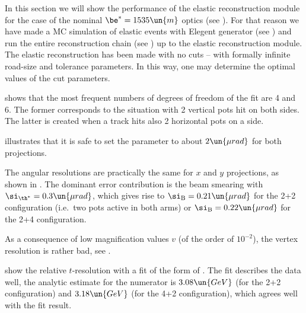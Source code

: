 In this section we will show the performance of the elastic reconstruction module for the case of the nominal $\be^* = 1535\un{m}$ optics (see ). For that reason we have made a MC simulation of elastic events with Elegent generator (see ) and run the entire reconstruction chain (see ) up to the elastic reconstruction module. The elastic reconstruction has been made with no cuts -- with formally infinite road-size and tolerance parameters. In this way, one may determine the optimal values of the cut parameters.

 shows that the most frequent numbers of degrees of freedom of the fit  are 4 and 6. The former corresponds to the situation with 2 vertical pots hit on both sides. The latter is created when a track hits also 2 horizontal pots on a side.

 illustrates that it is safe to set the  parameter to about $2\un{\mu rad}$ for both projections.

\bmfig
{}
\emfig

The angular resolutions are practically the same for $x$ and $y$ projections, as shown in . The dominant error contribution is the beam smearing with $\si_{\th^*} = 0.3\un{\mu rad}$, which gives rise to $\si_{\rm B} = 0.21 \un{\mu rad}$ for the 2+2 configuration (i.e.~two pots active in both arms) or $\si_{\rm B} = 0.22\un{\mu rad}$ for the 2+4 configuration.

As a consequence of low magnification values $v$ (of the order of $10^{-2}$), the vertex resolution is rather bad, see .

\bmfig
{}
\emfig

 show the relative $t$-resolution with a fit of the form of . The fit describes the data well, the analytic estimate for the numerator is $3.08\un{GeV}$ (for the 2+2 configuration) and $3.18\un{GeV}$ (for the 4+2 configuration), which agrees well with the fit result.



